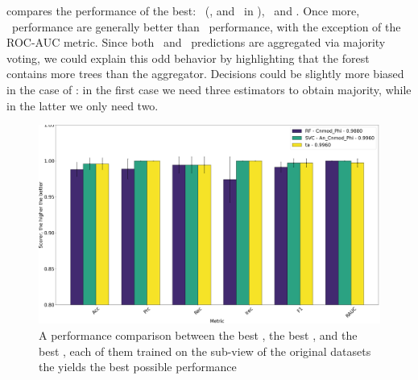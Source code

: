  compares the performance of the best: \ta\ (\an, \bn and \cnmod\ in
), \rf\ and \svc. Once more, \ta\ performance are generally better
than \rf\ performance, with the exception of the ROC-AUC metric. Since both \ta\ and \rf\
predictions are aggregated via majority voting, we could explain this odd
behavior by highlighting that the forest contains more trees than the aggregator. Decisions could be slightly more biased in the case of \ta: in the first case we need
three estimators to obtain majority, while in the latter we only need two.
\begin{figure}[!ht]
	\centering
	\includegraphics[width=\linewidth]{img/best_rf_ta_svc_compared.png}
	\caption{A performance comparison between the best \rf, the best \svc, and the best \ta,
		each of them trained on the sub-view of the original datasets the yields the best possible
		performance} \label{fig:ta-rf-svc-comparison}
\end{figure}

